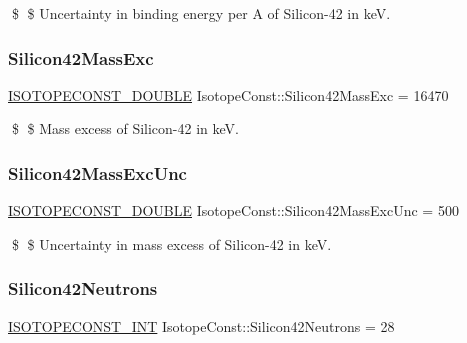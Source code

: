 \$ \$ Uncertainty in binding energy per A of Silicon-\/42 in keV. \mbox{\label{group___isotope_const-_silicon-_si42_ga8a8ca6c3515808de191f55a1fc9efcdb}} 
\subsubsection{\texorpdfstring{Silicon42\+Mass\+Exc}{Silicon42MassExc}}
{\footnotesize\ttfamily \mbox{\hyperlink{group___isotope_const-_macros_ga8f45a7272ce02c0b4c65c44636ed719a}{I\+S\+O\+T\+O\+P\+E\+C\+O\+N\+S\+T\+\_\+\+D\+O\+U\+B\+LE}} Isotope\+Const\+::\+Silicon42\+Mass\+Exc = 16470}

\$ \$ Mass excess of Silicon-\/42 in keV. \mbox{\label{group___isotope_const-_silicon-_si42_gabf826fd7c046cb094780c444d3e8788a}} 
\subsubsection{\texorpdfstring{Silicon42\+Mass\+Exc\+Unc}{Silicon42MassExcUnc}}
{\footnotesize\ttfamily \mbox{\hyperlink{group___isotope_const-_macros_ga8f45a7272ce02c0b4c65c44636ed719a}{I\+S\+O\+T\+O\+P\+E\+C\+O\+N\+S\+T\+\_\+\+D\+O\+U\+B\+LE}} Isotope\+Const\+::\+Silicon42\+Mass\+Exc\+Unc = 500}

\$ \$ Uncertainty in mass excess of Silicon-\/42 in keV. \mbox{\label{group___isotope_const-_silicon-_si42_ga19a35bf1323201a7d6ead92edcd1872e}} 
\subsubsection{\texorpdfstring{Silicon42\+Neutrons}{Silicon42Neutrons}}
{\footnotesize\ttfamily \mbox{\hyperlink{group___isotope_const-_macros_ga5f18360b3e99483a35c32d789e62621c}{I\+S\+O\+T\+O\+P\+E\+C\+O\+N\+S\+T\+\_\+\+I\+NT}} Isotope\+Const\+::\+Silicon42\+Neutrons = 28}


